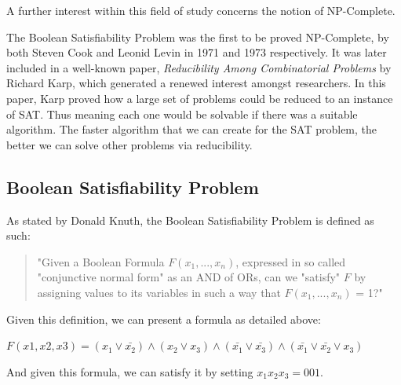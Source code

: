 \documentclass{article}
\begin{document}
A further interest within this field of study concerns the notion of NP-Complete. 

The Boolean Satisfiability Problem was the first to be proved NP-Complete, by both Steven Cook and
Leonid Levin in 1971 and 1973 respectively\cite{scook}\cite{levin}. It was later included in a
well-known paper, \textit{Reducibility Among Combinatorial Problems} by Richard Karp\cite{karp},
which generated a renewed interest amongst researchers. In this paper, Karp proved how a large
set of problems could be reduced to an instance of SAT. Thus meaning each one would be solvable if
there was a suitable algorithm. The faster algorithm that we can create for the SAT problem, the
better we can solve other problems via reducibility. 

\subsection{Boolean Satisfiability Problem}
As stated by Donald Knuth, the Boolean Satisfiability Problem is defined as such:

\begin{quotation}
    "Given a Boolean Formula $F(x_1,...,x_n)$, expressed in so called "conjunctive normal form" as an AND of ORs, can we "satisfy" $F$ by assigning values to its variables in such a way that $F(x_1,...,x_n)$ = 1?"
\end{quotation}

Given this definition, we can present a formula as detailed above:

\begin{center}
    $F(x1,x2,x3) = (x_1 \vee \bar{x_2}) \wedge (x_2 \vee x_3) \wedge (\bar{x_1} \vee \bar{x_3}) \wedge (\bar{x_1} \vee \bar{x_2} \vee x_3)$
\end{center}

And given this formula, we can satisfy it by setting $x_1x_2x_3 = 001$.
\end{document}
